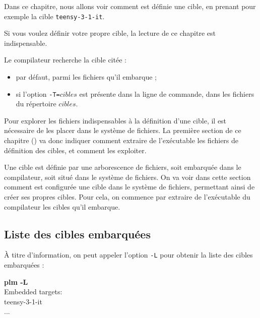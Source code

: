 





Dans ce chapitre, nous allons voir comment est définie une cible, en prenant pour exemple la cible \texttt{teensy-3-1-it}. 

Si vous voulez définir votre propre cible, la lecture de ce chapitre est indispensable. 

Le compilateur recherche la cible citée :
\begin{itemize}
  \item par défaut, parmi les fichiers qu'il embarque ;
  \item si l'option \texttt{-T=$cibles$} est présente dans la ligne de commande, dans les fichiers du répertoire $cibles$.
\end{itemize}

Pour explorer les fichiers indispensables à la définition d'une cible, il est nécessaire de les placer dans le système de fichiers. La première section de ce chapitre () va donc indiquer comment extraire de l'exécutable les fichiers de définition des cibles, et comment les exploiter.



Une cible est définie par une arborescence de fichiers, soit embarquée dans le compilateur, soit situé dans le système de fichiers. On va voir dans cette section comment est configurée une cible dans le système de fichiers, permettant ainsi de créer ses propres cibles. Pour cela, on commence par extraire de l'exécutable du compilateur les cibles qu'il embarque.

\subsection{Liste des cibles embarquées}
À titre d'information, on peut appeler l'option \texttt{-L} pour obtenir la liste des cibles embarquées :
\begin{SHELL}
{\bfseries plm -L}\\
Embedded targets:\\ 
\hspace*{1.2em}teensy-3-1-it\\
\hspace*{1.2em}...
\end{SHELL}

